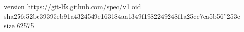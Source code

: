version https://git-lfs.github.com/spec/v1
oid sha256:52bc39393eb91a4324549e163184aa1349f1982249248f1a25cc7ca5b567253c
size 62575
